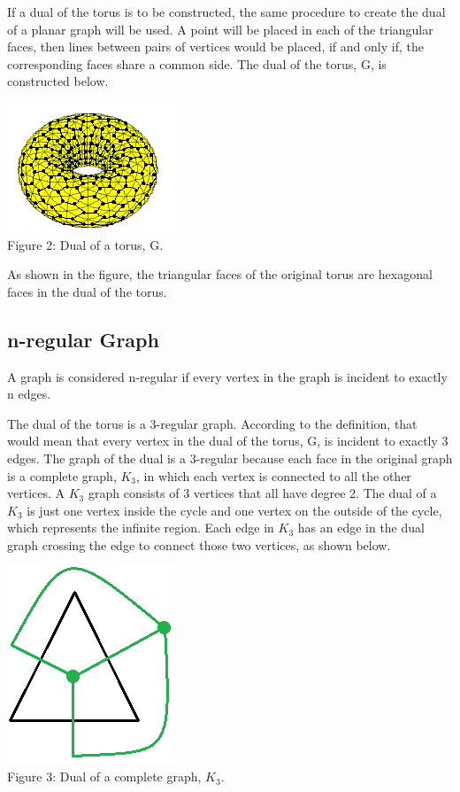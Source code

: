 \documentclass[12pt]{article}
\begin{document}
\begin{flushleft}
\medskip
If a dual of the torus is to be constructed, the same procedure to create the dual of a planar graph will be used. A point will be placed in each of the triangular faces, then lines between pairs of vertices would be placed, if and only if, the corresponding faces share a common side. The dual of the torus, G, is constructed below.

\begin{center}
\includegraphics[scale=1.25]{images/torus2.png}\\
Figure 2: Dual of a torus, G.
\end{center}

As shown in the figure, the triangular faces of the original torus are hexagonal faces in the dual of the torus.

\subsection*{n-regular Graph}
A graph is considered n-regular if every vertex in the graph is incident to exactly n edges.

\medskip
The dual of the torus is a 3-regular graph. According to the definition, that would mean that every vertex in the dual of the torus, G, is incident to exactly 3 edges. The graph of the dual is a 3-regular because each face in the original graph is a complete graph, $K_3$, in which each vertex is connected to all the other vertices. A $K_3$ graph consists of 3 vertices that all have degree 2. The dual of a $K_3$ is just one vertex inside the cycle and one vertex on the outside of the cycle, which represents the infinite region. Each edge in $K_3$ has an edge in the dual graph crossing the edge to connect those two vertices, as shown below.

\begin{center}
\includegraphics[scale=1]{images/k3dual.png}\\
Figure 3: Dual of a complete graph, $K_3$.
\end{center}


\end{flushleft}
\end{document}
